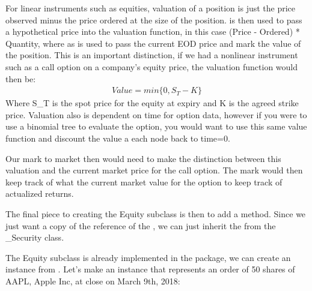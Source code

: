\documentclass[letterpaper,10pt,english]{sphinxmanual}
\begin{document}
For linear instruments such as equities, valuation of a position is just
the price observed minus the price ordered at the size of the position.
 is then used to pass a hypothetical price into the
valuation function, in this case (Price - Ordered) * Quantity, where as
 is used to pass the current EOD price and mark the
value of the position. This is an important distinction, if we had a
nonlinear instrument such as a call option on a company’s equity price,
the valuation function would then be:
\begin{equation*}
\begin{split}Value = min\{0, S_{T} - K\}\end{split}
\end{equation*}
Where S_{T} is the spot price for the equity at expiry and
K is the agreed strike price. Valuation also is dependent on
time for option data, however if you were to use a binomial tree to
evaluate the option, you would want to use this same value function and
discount the value a each node back to time=0.

Our mark to market then would need to make the distinction between this
valuation and the current market price for the call option. The mark
would then keep track of what the current market value for the option to
keep track of actualized returns.

The final piece to creating the Equity subclass is then to add a
method. Since we just want a copy of the reference
of the , we can just inherit the 
from the \_Security class.

The Equity subclass is already implemented in the package, we can create
an instance from . Let’s make an instance that
represents an order of 50 shares of AAPL, Apple Inc, at close on March
9th, 2018:
\end{document}
